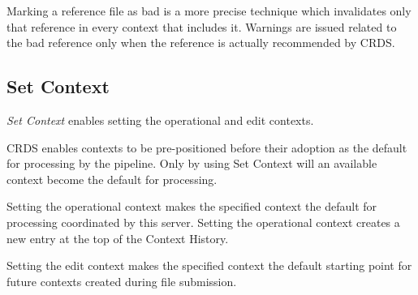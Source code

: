 \documentclass[letterpaper,10pt,english]{sphinxmanual}
\begin{document}
Marking a reference file as bad is a more precise technique which invalidates
only that reference in every context that includes it.   Warnings are issued related
to the bad reference only when the reference is actually recommended by CRDS.


\subsection{Set Context}
\label{web_site_use:set-context}
\emph{Set Context} enables setting the operational and edit contexts.
\begin{figure}[htbp]
\centering

\end{figure}

CRDS enables contexts to be pre-positioned before their adoption as the default
for processing by the pipeline.  Only by using Set Context will an available
context become the default for processing.

Setting the operational context makes the specified context the default for
processing coordinated by this server.  Setting the operational context creates
a new entry at the top of the Context History.

Setting the edit context makes the specified context the default starting point
for future contexts created during file submission.
\end{document}
